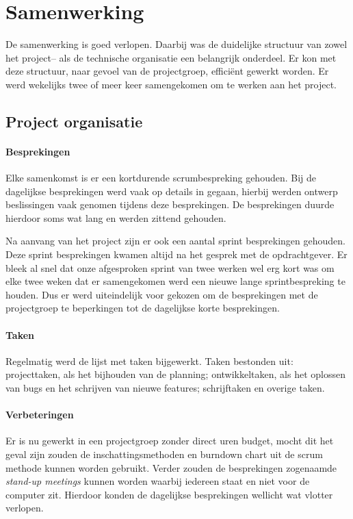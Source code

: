 \section{Samenwerking}
De samenwerking is goed verlopen. Daarbij was de duidelijke structuur van zowel het project– als de technische organisatie een belangrijk onderdeel. Er kon met deze structuur, naar gevoel van de projectgroep, efficiënt gewerkt worden. Er werd wekelijks twee of meer keer samengekomen om te werken aan het project.

\subsection{Project organisatie}

\paragraph{Besprekingen} Elke samenkomst is er een kortdurende scrumbespreking gehouden. Bij de dagelijkse besprekingen werd vaak op details in gegaan, hierbij werden ontwerp beslissingen vaak genomen tijdens deze besprekingen. De besprekingen duurde hierdoor soms wat lang en werden zittend gehouden.


 Na aanvang van het project zijn er ook een aantal sprint besprekingen gehouden. Deze sprint besprekingen kwamen altijd na het gesprek met de opdrachtgever. Er bleek al snel dat onze afgesproken sprint van twee werken wel erg kort was om elke twee weken dat er samengekomen werd een nieuwe lange sprintbespreking te houden. Dus er werd uiteindelijk voor gekozen om de besprekingen met de projectgroep te beperkingen tot de dagelijkse korte besprekingen.

 \paragraph{Taken}
Regelmatig werd de lijst met taken bijgewerkt. Taken bestonden uit: projecttaken, als het bijhouden van de planning; ontwikkeltaken, als het oplossen van bugs en het schrijven van nieuwe features; schrijftaken en overige taken.

\paragraph{Verbeteringen} Er is nu gewerkt in een projectgroep zonder direct uren budget, mocht dit het geval zijn zouden de inschattingsmethoden en burndown chart uit de scrum methode kunnen worden gebruikt. Verder zouden de besprekingen zogenaamde \emph{stand-up meetings} kunnen worden waarbij iedereen staat en niet voor de computer zit. Hierdoor konden de dagelijkse besprekingen wellicht wat vlotter verlopen.

